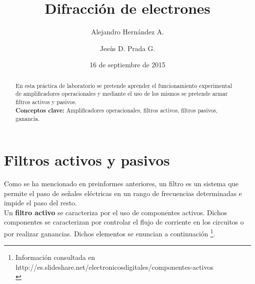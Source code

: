 \documentclass[prb,aps,preprintnumbers,amsmath,amssymb]{revtex4}
\begin{document}
\title{Difracción de electrones}%

\author{Alejandro Hernández A.}%
\author{Jesús D. Prada G.}%
%

\date{16 de septiembre de 2015}%

\begin{abstract}
En esta práctica de laboratorio se pretende aprender el funcionamiento experimental de amplificadores operacionales y mediante el uso de los mismos se pretende armar filtros activos y pasivos.\\

\noindent \textbf{Conceptos clave:} Amplificadores operacionales, filtros activos, filtros pasivos, ganancia.
\end{abstract}
                             
\maketitle

\section{Filtros activos y pasivos}
Como se ha mencionado en preinformes anteriores, un filtro es un sistema que permite el paso de señales eléctricas en un rango de
frecuencias determinadas e impide el paso del resto.\\

Un \textbf{filtro activo} se caracteriza por el uso de componentes activos. Dichos componentes se caracterizan por controlar el flujo de corriente en los circuitos o por realizar ganancias. Dichos elementos se enuncian a continuación \footnote{Información consultada en http://es.slideshare.net/electronicosdigitales/componentes-activos\\}.
\end{document}
